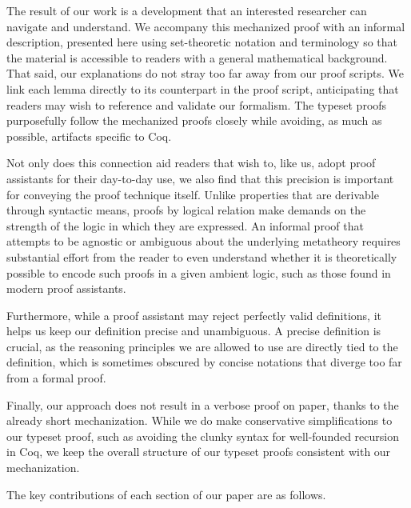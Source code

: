 \documentclass[acmsmall,screen=true,
\ifpublic review=false\else,review=true\fi
  ,anonymous=\ifanonymous true\else false\fi]{acmart}
\newcommand{\scw}[1]{}
\begin{document}
The result of our work is a development that an interested researcher can
navigate and understand. We accompany this mechanized proof with an informal
description, presented here using set-theoretic notation and terminology so that
the material is accessible to readers with a general mathematical background.
That said, our explanations do not stray too far away from our proof scripts.
We link each lemma directly to its counterpart in the proof script,
anticipating that readers may wish to reference and validate our formalism.
The typeset proofs purposefully follow the
mechanized proofs closely while avoiding, as much as possible, artifacts specific to Coq.

Not only does this connection aid readers that wish to, like us, adopt proof
assistants for their day-to-day use, we also find that this precision is
important for conveying the proof technique itself. Unlike properties that are
derivable through syntactic means, proofs by logical relation make demands on
the strength of the logic in which they are expressed. An informal proof that
attempts to be agnostic or ambiguous about the underlying
metatheory %
requires substantial
effort from the reader to even understand whether it is theoretically
possible to encode such proofs in a given ambient logic, such as those found
in modern proof assistants.

Furthermore, while a proof assistant may reject perfectly valid definitions,
it helps us keep our definition precise and unambiguous. A precise definition
is crucial, as the reasoning principles we are allowed to use are directly tied
to the definition, which is sometimes obscured by concise notations that
diverge too far from a formal proof.

Finally, our approach does not result in a verbose proof on paper, thanks to
the already short mechanization. While we do make conservative simplifications
to our typeset proof, such as avoiding the clunky syntax for well-founded
recursion in Coq, we keep the overall structure of our typeset proofs
consistent with our mechanization.

The key contributions of each section of our paper are as follows.
\scw{I'm still not happy with this overview / contributions list. }
\end{document}
